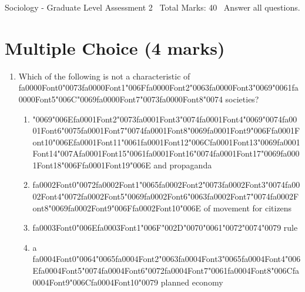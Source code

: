 \documentclass[12pt]{article}
\begin{document}
\begin{center}
Sociology - Graduate Level Assessment 2 \
Total Marks: 40 \
Answer all questions.
\end{center}

\section*{Multiple Choice (4 marks)}
\begin{enumerate}[label=\arabic*.]
\item Which of the following is not a characteristic of {\csname fa0000Font0\endcsname\char"0073}{\csname fa0000Font1\endcsname\char"006F}{\csname fa0000Font2\endcsname\char"0063}{\csname fa0000Font3\endcsname\char"0069}{\char"0061}{\csname fa0000Font5\endcsname\char"006C}{\char"0069}{\csname fa0000Font7\endcsname\char"0073}{\csname fa0000Font8\endcsname\char"0074} societies?
\begin{enumerate}[label=(\alph*)]
    \item {\char"0069}{\char"006E}{\csname fa0001Font2\endcsname\char"0073}{\csname fa0001Font3\endcsname\char"0074}{\csname fa0001Font4\endcsname\char"0069}{\char"0074}{\csname fa0001Font6\endcsname\char"0075}{\csname fa0001Font7\endcsname\char"0074}{\csname fa0001Font8\endcsname\char"0069}{\csname fa0001Font9\endcsname\char"006F}{\csname fa0001Font10\endcsname\char"006E}{\csname fa0001Font11\endcsname\char"0061}{\csname fa0001Font12\endcsname\char"006C}{\csname fa0001Font13\endcsname\char"0069}{\csname fa0001Font14\endcsname\char"007A}{\csname fa0001Font15\endcsname\char"0061}{\csname fa0001Font16\endcsname\char"0074}{\csname fa0001Font17\endcsname\char"0069}{\csname fa0001Font18\endcsname\char"006F}{\csname fa0001Font19\endcsname\char"006E} and propaganda
    \item {\csname fa0002Font0\endcsname\char"0072}{\csname fa0002Font1\endcsname\char"0065}{\csname fa0002Font2\endcsname\char"0073}{\csname fa0002Font3\endcsname\char"0074}{\csname fa0002Font4\endcsname\char"0072}{\csname fa0002Font5\endcsname\char"0069}{\csname fa0002Font6\endcsname\char"0063}{\csname fa0002Font7\endcsname\char"0074}{\csname fa0002Font8\endcsname\char"0069}{\csname fa0002Font9\endcsname\char"006F}{\csname fa0002Font10\endcsname\char"006E} of movement for citizens
    \item {\csname fa0003Font0\endcsname\char"006E}{\csname fa0003Font1\endcsname\char"006F}{\char"002D}{\char"0070}{\char"0061}{\char"0072}{\char"0074}{\char"0079} rule
    \item a {\csname fa0004Font0\endcsname\char"0064}{\char"0065}{\csname fa0004Font2\endcsname\char"0063}{\csname fa0004Font3\endcsname\char"0065}{\csname fa0004Font4\endcsname\char"006E}{\csname fa0004Font5\endcsname\char"0074}{\csname fa0004Font6\endcsname\char"0072}{\csname fa0004Font7\endcsname\char"0061}{\csname fa0004Font8\endcsname\char"006C}{\csname fa0004Font9\endcsname\char"006C}{\csname fa0004Font10\endcsname\char"0079} planned economy

\end{enumerate}
\end{enumerate}
\end{document}
